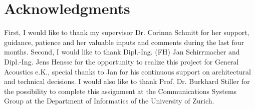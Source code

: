 \chapter*{Acknowledgments}
First, I would like to thank my supervisor Dr. Corinna Schmitt for her support, guidance, patience and her valuable inputs and comments during the last four months. Second, I would like to thank Dipl.-Ing. (FH) Jan Schirrmacher and Dipl.-Ing. Jens Hensse for the opportunity to realize this project for General Acoustics e.K., special thanks to Jan for his continuous support on architectural and technical decisions. I would also like to thank Prof. Dr. Burkhard Stiller for the possibility to complete this assignment at the Communications Systems Group at the Department of Informatics of the University of Zurich.